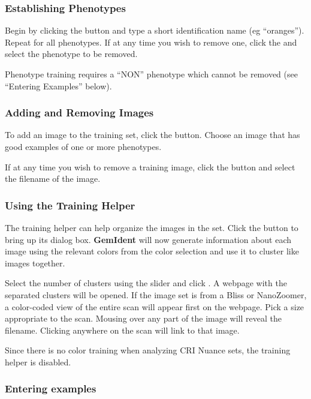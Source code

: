\documentclass[12pt]{article}
\begin{document}
\subsubsection{Establishing Phenotypes}

Begin by clicking the  button and type a short identification name (eg ``oranges''). Repeat for all phenotypes. If at any time you wish to remove one, click the  and select the phenotype to be removed.

Phenotype training requires a ``NON'' phenotype which cannot be removed (see ``Entering Examples'' below).

\subsubsection{Adding and Removing Images}

To add an image to the training set, click the  button. Choose an image that has good examples of one or more phenotypes.

If at any time you wish to remove a training image, click the  button and select the filename of the image.

\subsubsection{Using the Training Helper}

The training helper can help organize the images in the set. Click the  button to bring up its dialog box. {\bf GemIdent} will now generate information about each image using the relevant colors from the {\sf color selection} and use it to cluster like images together. 

Select the number of clusters using the slider and click . A webpage with the separated clusters will be opened. If the image set is from a Bliss or NanoZoomer, a color-coded view of the entire scan will appear first on the webpage. Pick a size appropriate to the scan. Mousing over any part of the image will reveal the filename. Clicking anywhere on the scan will link to that image.

Since there is no color training when analyzing CRI Nuance sets, the training helper is disabled.

\subsubsection{Entering examples}
\end{document}
